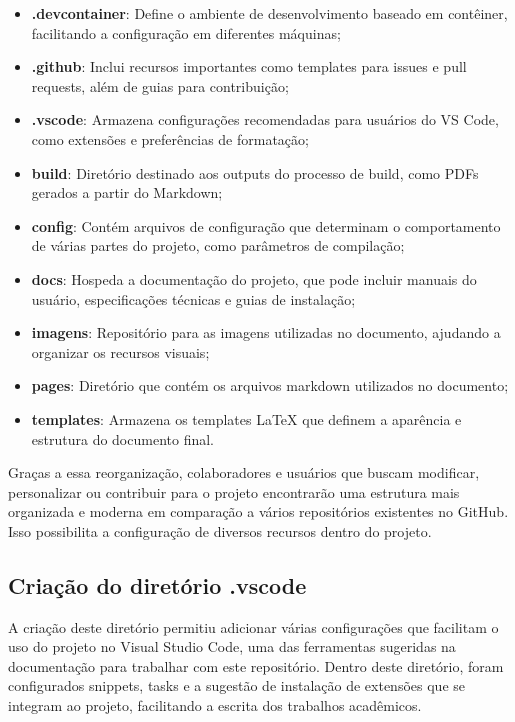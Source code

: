 \documentclass[
	12pt,				%
	oneside,			%
	a4paper,			%
	english,			%
	french,				%
	spanish,			%
	brazil				%
	]{abntex2}
\begin{document}
\begin{itemize}
\tightlist
\item
  \textbf{.devcontainer}: Define o ambiente de desenvolvimento baseado
  em contêiner, facilitando a configuração em diferentes máquinas;
\item
  \textbf{.github}: Inclui recursos importantes como templates para
  issues e pull requests, além de guias para contribuição;
\item
  \textbf{.vscode}: Armazena configurações recomendadas para usuários do
  VS Code, como extensões e preferências de formatação;
\item
  \textbf{build}: Diretório destinado aos outputs do processo de build,
  como PDFs gerados a partir do Markdown;
\item
  \textbf{config}: Contém arquivos de configuração que determinam o
  comportamento de várias partes do projeto, como parâmetros de
  compilação;
\item
  \textbf{docs}: Hospeda a documentação do projeto, que pode incluir
  manuais do usuário, especificações técnicas e guias de instalação;
\item
  \textbf{imagens}: Repositório para as imagens utilizadas no documento,
  ajudando a organizar os recursos visuais;
\item
  \textbf{pages}: Diretório que contém os arquivos markdown utilizados
  no documento;
\item
  \textbf{templates}: Armazena os templates LaTeX que definem a
  aparência e estrutura do documento final.
\end{itemize}

Graças a essa reorganização, colaboradores e usuários que buscam
modificar, personalizar ou contribuir para o projeto encontrarão uma
estrutura mais organizada e moderna em comparação a vários repositórios
existentes no GitHub. Isso possibilita a configuração de diversos
recursos dentro do projeto.

\hypertarget{criauxe7uxe3o-do-diretuxf3rio-.vscode}{%
\subsection{Criação do diretório
.vscode}\label{criauxe7uxe3o-do-diretuxf3rio-.vscode}}

A criação deste diretório permitiu adicionar várias configurações que
facilitam o uso do projeto no Visual Studio Code, uma das ferramentas
sugeridas na documentação para trabalhar com este repositório. Dentro
deste diretório, foram configurados snippets, tasks e a sugestão de
instalação de extensões que se integram ao projeto, facilitando a
escrita dos trabalhos acadêmicos.
\end{document}
